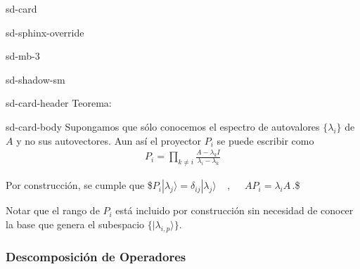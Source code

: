 \documentclass[letterpaper,10pt,english]{jupyterBook}
\newcommand{\ket}[1]{|#1\rangle}
\begin{document}
\begin{sphinxuseclass}{sd-card}
\begin{sphinxuseclass}{sd-sphinx-override}
\begin{sphinxuseclass}{sd-mb-3}
\begin{sphinxuseclass}{sd-shadow-sm}
\begin{sphinxuseclass}{sd-card-header}
\sphinxAtStartPar
Teorema:

\end{sphinxuseclass}
\begin{sphinxuseclass}{sd-card-body}
\sphinxAtStartPar
Supongamos que sólo conocemos el espectro de autovalores \(\{\lambda_i\}\) de \(A\)  y no sus autovectores. Aun así el proyector \(P_i\) se puede escribir como
\begin{equation*}
\begin{split}
P_i = \prod_{k\neq i}\frac{A -\lambda_k I}{ \lambda_i -\lambda_k}
\end{split}
\end{equation*}
\end{sphinxuseclass}
\end{sphinxuseclass}
\end{sphinxuseclass}
\end{sphinxuseclass}
\end{sphinxuseclass}
\sphinxAtStartPar
Por construcción,  se cumple que
\$\(
 P_i \ket{\lambda_j} = \delta_{ij}\ket{\lambda_j}~~~~~,  ~~~~ ~~AP_i = \lambda_i A \, .
\)\$

\sphinxAtStartPar
Notar que el rango de \(P_i\) está incluido por construcción sin necesidad de conocer la base que genera el subespacio \(\{\ket{\lambda_{i,p}}\}\).


\subsubsection{Descomposición de Operadores}
\label{\detokenize{docs/Part_01_Formalismo/Chapter_01_02_Formalismo_matem_xe1tico/01_03_Operadores_myst:descomposicion-de-operadores}}
\sphinxAtStartPar
\end{document}
